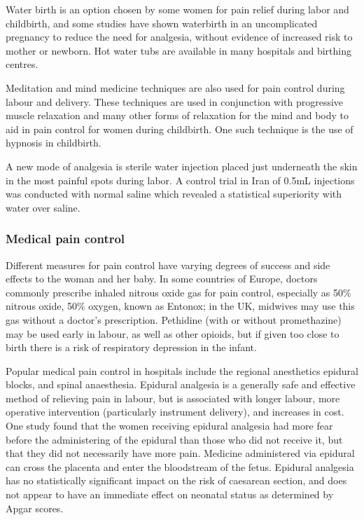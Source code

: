 \documentclass[12pt,a4paper,onecolumn]{article}
\begin{document}
Water birth is an option chosen by some women for pain relief during labor and childbirth, and some
studies have shown waterbirth in an uncomplicated pregnancy to reduce the need for analgesia,
without evidence of increased risk to mother or newborn. Hot water tubs are available in many
hospitals and birthing centres.

Meditation and mind medicine techniques are also used for pain control during labour and delivery.
These techniques are used in conjunction with progressive muscle relaxation and many other forms of
relaxation for the mind and body to aid in pain control for women during childbirth. One such
technique is the use of hypnosis in childbirth.

A new mode of analgesia is sterile water injection placed just underneath the skin in the most
painful spots during labor. A control trial in Iran of 0.5mL injections was conducted with normal
saline which revealed a statistical superiority with water over saline. 

\subsubsection{Medical pain control}

Different measures for pain control have varying degrees of success and side effects to the woman
and her baby. In some countries of Europe, doctors commonly prescribe inhaled nitrous oxide gas for
pain control, especially as 50\% nitrous oxide, 50\% oxygen, known as Entonox; in the UK, midwives
may use this gas without a doctor's prescription. Pethidine (with or without promethazine) may be
used early in labour, as well as other opioids, but if given too close to birth there is a risk of
respiratory depression in the infant.

Popular medical pain control in hospitals include the regional anesthetics epidural blocks, and
spinal anaesthesia. Epidural analgesia is a generally safe and effective method of relieving pain in
labour, but is associated with longer labour, more operative intervention (particularly instrument
delivery), and increases in cost. One study found that the women receiving epidural analgesia had
more fear before the administering of the epidural than those who did not receive it, but that they
did not necessarily have more pain. Medicine administered via epidural can cross the placenta and
enter the bloodstream of the fetus. Epidural analgesia has no statistically significant impact on
the risk of caesarean section, and does not appear to have an immediate effect on neonatal status as
determined by Apgar scores.
\end{document}
